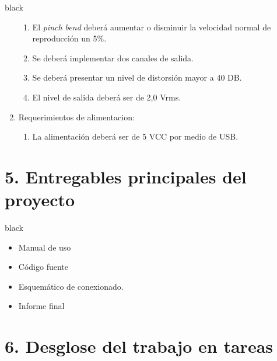 \documentclass[11pt]{charter}
\begin{document}
\begin{consigna}{black}
\begin{enumerate}
\begin{enumerate}
	\item El \textit{pinch bend} deberá aumentar o disminuir la velocidad normal de reproducción un 5\%.
	\item Se deberá implementar dos canales de salida.
	\item Se deberá presentar un nivel de distorsión mayor a 40 DB.
	\item El nivel de salida deberá ser de 2,0 Vrms.
	\end{enumerate}
\item Requerimientos de alimentacion:
	\begin{enumerate}
	\item La alimentación deberá ser de 5 VCC por medio de USB.
	\end{enumerate}
\end{enumerate}
\end{consigna}

\section{5. Entregables principales del proyecto}
\label{sec:entregables}

\begin{consigna}{black}
\begin{itemize}
\item Manual de uso
\item Código fuente
\item Esquemático de conexionado.
\item Informe final

\end{itemize}

\end{consigna}

\section{6. Desglose del trabajo en tareas}
\label{sec:wbs}
\end{document}
